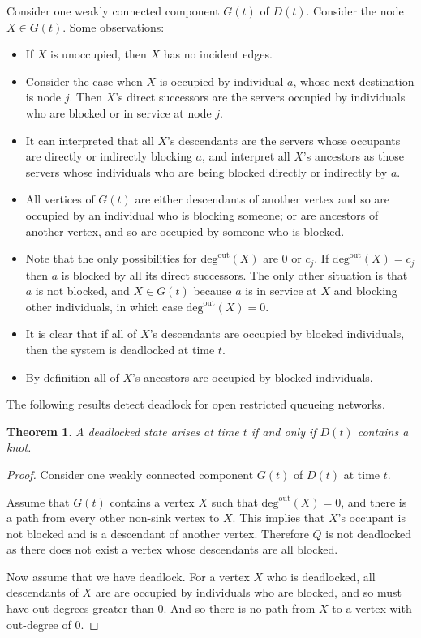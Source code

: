 \documentclass{article}
\newtheorem{theorem}{Theorem}
\numberwithin{equation}{section}
\begin{document}
Consider one weakly connected component $G(t)$ of $D(t)$. Consider the node $X \in G(t)$. Some observations:

\begin{itemize}

  \item If $X$ is unoccupied, then $X$ has no incident edges.
  \item Consider the case when $X$ is occupied by individual $a$, whose next destination is node $j$. Then $X$'s direct successors are the servers occupied by individuals who are blocked or in service at node $j$.
  \item It can interpreted that all $X$'s descendants are the servers whose occupants are directly or indirectly blocking $a$, and interpret all $X$'s ancestors as those servers whose individuals who are being blocked directly or indirectly by $a$.
  \item All vertices of $G(t)$ are either descendants of another vertex and so are occupied by an individual who is blocking someone; or are ancestors of another vertex, and so are occupied by someone who is blocked.
  \item Note that the only possibilities for $\text{deg}^{\text{out}}(X)$ are 0 or $c_j$. If $\text{deg}^{\text{out}}(X) = c_j$ then $a$ is blocked by all its direct successors. The only other situation is that $a$ is not blocked, and $X \in G(t)$ because $a$ is in service at $X$ and blocking other individuals, in which case $\text{deg}^{\text{out}}(X) = 0$.
  \item It is clear that if all of $X$'s descendants are occupied by blocked individuals, then the system is deadlocked at time $t$.
  \item By definition all of $X$'s ancestors are occupied by blocked individuals.

\end{itemize}

The following results detect deadlock for open restricted queueing networks.\\

\begin{theorem}\label{thrm:knot}
A deadlocked state arises at time $t$ if and only if $D(t)$ contains a knot.
\end{theorem}

\begin{proof}
Consider one weakly connected component $G(t)$ of $D(t)$ at time $t$.

Assume that $G(t)$ contains a vertex $X$ such that $\text{deg}^{\text{out}}(X) = 0$, and there is a path from every other non-sink vertex to $X$.
This implies that $X$'s occupant is not blocked and is a descendant of another vertex.
Therefore $Q$ is not deadlocked as there does not exist a vertex whose descendants are all blocked.

Now assume that we have deadlock.
For a vertex $X$ who is deadlocked, all descendants of $X$ are are occupied by individuals who are blocked, and so must have out-degrees greater than 0.
And so there is no path from $X$ to a vertex with out-degree of 0.

\end{proof}
\end{document}
